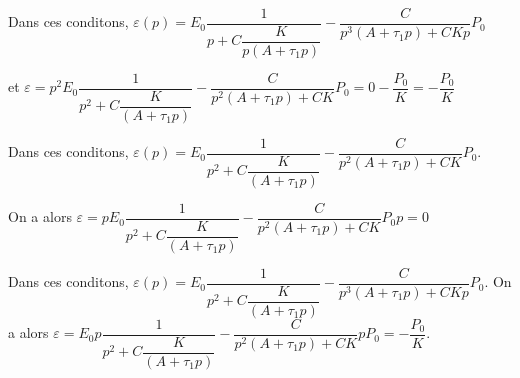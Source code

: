 Dans ces conditons, 
$\varepsilon(p) = E_0\dfrac{1}{p +C\dfrac{K}{p\left( A+\tau_1 p \right)}}-\dfrac{C}{p^3\left( A+\tau_1 p \right) +CKp} P_0$

et  $\varepsilon = p^2E_0\dfrac{1}{p^2 +C\dfrac{K}{\left( A+\tau_1 p \right)}}-\dfrac{C}{p^2\left( A+\tau_1 p \right) +CK} P_0 = 0 - \dfrac{P_0}{K}=- \dfrac{P_0}{K}$
\else 
\fi

\ifprof

Dans ces conditons, 
$\varepsilon(p) = E_0\dfrac{1}{p^2 +C\dfrac{K}{\left( A+\tau_1 p \right)}}-\dfrac{C}{p^2\left( A+\tau_1 p \right) +CK} P_0$.


On a alors $\varepsilon = pE_0\dfrac{1}{p^2 +C\dfrac{K}{\left( A+\tau_1 p \right)}}-\dfrac{C}{p^2\left( A+\tau_1 p \right) +CK} P_0p = 0$


\else 
\fi

\ifprof

Dans ces conditons, 
$\varepsilon(p) = E_0\dfrac{1}{p^2 +C\dfrac{K}{\left( A+\tau_1 p \right)}}-\dfrac{C}{p^3\left( A+\tau_1 p \right) +CKp} P_0$. 
On a alors
$\varepsilon = E_0 p \dfrac{1}{p^2 +C\dfrac{K}{\left( A+\tau_1 p \right)}}-\dfrac{C}{p^2\left( A+\tau_1 p \right) +CK} p P_0 = -\dfrac{P_0}{K} $.

\else 
\fi






 

\ifprof
\else


\fi